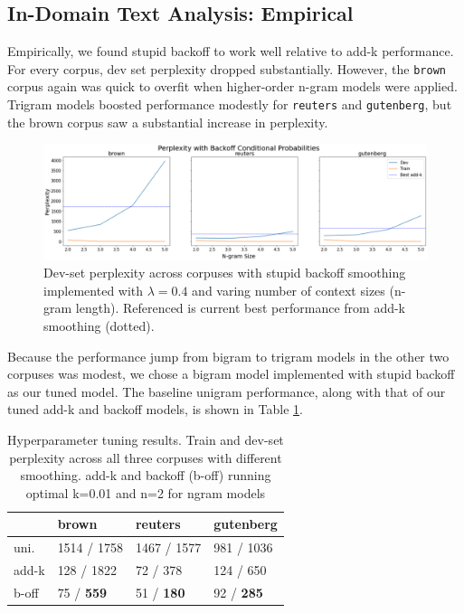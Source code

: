 \documentclass[11pt,a4paper]{article}
\begin{document}
\subsection{In-Domain Text Analysis: Empirical}%
\label{sec:in_domain_text_analysis_empirical}

Empirically, we found stupid backoff to work well relative to add-k performance. For every corpus, dev set perplexity
dropped substantially. However, the \texttt{brown} corpus again was quick to overfit when higher-order n-gram models were applied. Trigram models boosted performance modestly for \texttt{reuters} and \texttt{gutenberg}, but the brown corpus saw a substantial increase in perplexity.
\FloatBarrier
\begin{figure}[htpb]
  \centering
  \includegraphics[width=1\linewidth]{imgs/backoff.png}
  \caption{Dev-set perplexity across corpuses with stupid backoff
  smoothing implemented with $\lambda=0.4$ and varing number of
  context sizes (n-gram length). Referenced is current best 
performance from add-k smoothing (dotted).}
  \label{fig:backoff}
  \vspace{-15pt}
\end{figure}
\FloatBarrier



 Because the
performance jump from bigram to trigram models in the other two corpuses was modest, we chose a bigram
model implemented with stupid backoff as our tuned model. The baseline unigram performance, along with that of our tuned add-k and backoff models,
is shown in Table \ref{table:hyperparameter}.


\begin{table}
\begin{tabular}{llll}
\hline
         & brown       & reuters     & gutenberg   \\
\hline
 uni. & 1514 / 1758 & 1467 / 1577 & 981 / 1036  \\
 add-k   & 128 / 1822  & 72 / 378    & 124 / 650   \\
 b-off & 75 / \textbf{ 559 }    & 51 / \textbf{ 180 }    & 92 / \textbf{ 285 }    \\
\hline
\end{tabular}
\caption{Hyperparameter tuning results. Train and dev-set perplexity across
all three corpuses with different smoothing. add-k and backoff (b-off) 
running optimal k=0.01 and n=2 for ngram models}
\label{table:hyperparameter}
\end{table}
\end{document}

